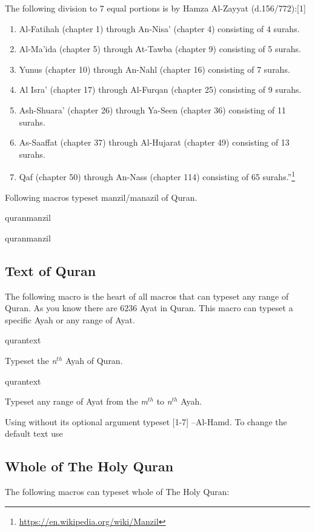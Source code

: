 \documentclass{ltxdoc}
\begin{document}
The following division to 7 equal portions is by Hamza Al-Zayyat (d.156/772):[1]
\begin{enumerate}
    \item Al-Fatihah (chapter 1) through An-Nisa' (chapter 4) consisting of 4 surahs.
    \item Al-Ma'ida (chapter 5) through At-Tawba (chapter 9) consisting of 5 surahs.
    \item Yunus (chapter 10) through An-Nahl (chapter 16) consisting of 7 surahs.
    \item Al Isra' (chapter 17) through Al-Furqan (chapter 25) consisting of 9 surahs.
    \item Ash-Shuara' (chapter 26) through Ya-Seen (chapter 36) consisting of 11 surahs.
    \item As-Saaffat (chapter 37) through Al-Hujarat (chapter 49) consisting of 13 surahs.
    \item Qaf (chapter 50) through An-Nass (chapter 114) consisting of 65 surahs.''\footnote{\url{https://en.wikipedia.org/wiki/Manzil}}
\end{enumerate}

Following macros typeset manzil/manazil of Quran.

\begin{declcs}{quranmanzil}
\end{declcs}
\begin{declcs}{quranmanzil}
\end{declcs}

\subsection{Text of Quran}
The following macro is the heart of all macros that can typeset any range of Quran. As you know there 
are $6236$ Ayat in Quran. This macro can typeset a specific Ayah or any range of Ayat. 

\begin{declcs}{qurantext}
\end{declcs}
Typeset the \textit{n}$^{th}$ Ayah of Quran. 

\begin{declcs}{qurantext}
\end{declcs}
Typeset any range of Ayat from the \textit{m}$^{th}$ to \textit{n}$^{th}$ Ayah. 
 
Using  without its optional argument typeset [1-7] --Al-Hamd. To
change the default text use 
\subsection{Whole of The Holy Quran}
The following macros can typeset whole of The Holy Quran:
\end{document}
